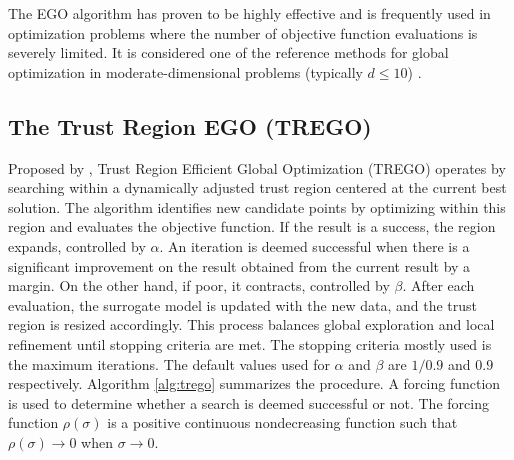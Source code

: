 \documentclass [PhD] {package/uclathes}
\begin{document}
The EGO algorithm has proven to be highly effective and is frequently used in optimization problems where the number of objective function evaluations is severely limited. It is considered one of the reference methods for global optimization in moderate-dimensional problems (typically \(d \leq 10\)) \parencite{jones2001taxonomy}.

\subsection{The Trust Region EGO (TREGO)}
Proposed by \textcite{diouane2022trego}, Trust Region Efficient Global Optimization (TREGO) operates by searching within a dynamically adjusted trust region centered at the current best solution. The algorithm identifies new candidate points by optimizing within this region and evaluates the objective function.
If the result is a success,  the region expands, controlled by \(\alpha\). An iteration is deemed successful when there is a significant improvement on the result obtained from the current result by a margin.
On the other hand, if poor, it contracts, controlled by \(\beta\). After each evaluation, the surrogate model is updated with the new data, and the trust region is resized accordingly. This process balances global exploration and local refinement until stopping criteria are met. The stopping criteria mostly used is the maximum iterations.
The default values used for \(\alpha\) and \(\beta\) are $1/0.9$ and $0.9$ respectively. Algorithm \ref{alg:trego} summarizes the procedure. A forcing function is used to determine whether a search is deemed successful or not. The forcing function $\rho(\sigma)$ is a positive continuous nondecreasing function such that $\rho(\sigma) \rightarrow 0$ when $\sigma \rightarrow 0$.
\end{document}
